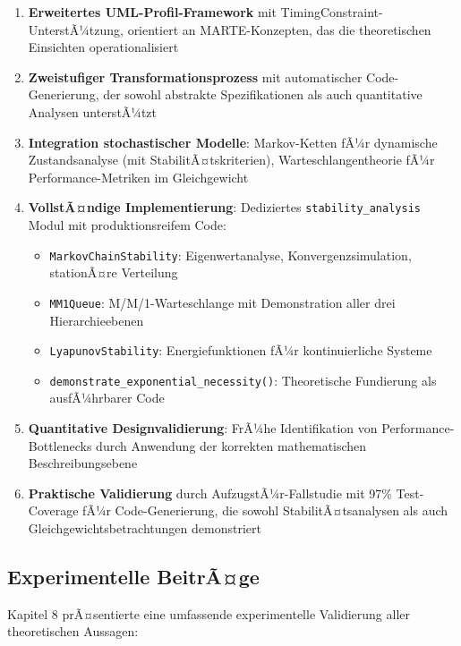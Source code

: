 ﻿\documentclass[a4paper,12pt]{report}
\theoremstyle{definition}
\begin{document}
\begin{enumerate}
	\item[-] \textbf{Erweitertes UML-Profil-Framework} mit TimingConstraint-UnterstÃ¼tzung, orientiert an MARTE-Konzepten, das die theoretischen Einsichten operationalisiert
	
	\item[-] \textbf{Zweistufiger Transformationsprozess} mit automatischer Code-Generierung, der sowohl abstrakte Spezifikationen als auch quantitative Analysen unterstÃ¼tzt
	
	\item[-] \textbf{Integration stochastischer Modelle}: Markov-Ketten fÃ¼r dynamische Zustandsanalyse (mit StabilitÃ¤tskriterien), Warteschlangentheorie fÃ¼r Performance-Metriken im Gleichgewicht
	
	\item[-] \textbf{VollstÃ¤ndige Implementierung}: Dediziertes \texttt{stability\_analysis} Modul mit produktionsreifem Code:
	\begin{itemize}
		\item[-] \texttt{MarkovChainStability}: Eigenwertanalyse, Konvergenzsimulation, stationÃ¤re Verteilung
		\item[-] \texttt{MM1Queue}: M/M/1-Warteschlange mit Demonstration aller drei Hierarchieebenen
		\item[-] \texttt{LyapunovStability}: Energiefunktionen fÃ¼r kontinuierliche Systeme
		\item[-] \texttt{demonstrate\_exponential\_necessity()}: Theoretische Fundierung als ausfÃ¼hrbarer Code
	\end{itemize}
	
	\item[-] \textbf{Quantitative Designvalidierung}: FrÃ¼he Identifikation von Performance-Bottle\-necks durch Anwendung der korrekten mathematischen Beschreibungsebene
	
	\item[-] \textbf{Praktische Validierung} durch AufzugstÃ¼r-Fallstudie mit 97\% Test-Coverage fÃ¼r Code-Generierung, die sowohl StabilitÃ¤tsanalysen als auch Gleichgewichtsbetrachtungen demonstriert
\end{enumerate}

\subsection{Experimentelle BeitrÃ¤ge}

Kapitel 8 prÃ¤sentierte eine umfassende experimentelle Validierung aller theoretischen Aussagen:
\end{document}

